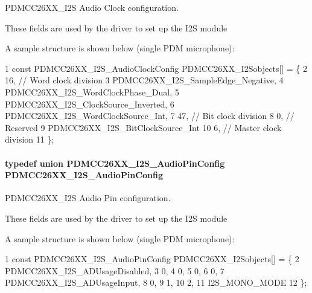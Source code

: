 P\+D\+M\+C\+C26\+X\+X\+\_\+\+I2\+S Audio Clock configuration. 

These fields are used by the driver to set up the I2\+S module

A sample structure is shown below (single P\+D\+M microphone)\+: 
\begin{DoxyCode}
1 const PDMCC26XX\_I2S\_AudioClockConfig PDMCC26XX\_I2Sobjects[] = \{
2         16, // Word clock division
3         PDMCC26XX\_I2S\_SampleEdge\_Negative,
4         PDMCC26XX\_I2S\_WordClockPhase\_Dual,
5         PDMCC26XX\_I2S\_ClockSource\_Inverted,
6         PDMCC26XX\_I2S\_WordClockSource\_Int,
7         47, // Bit clock division
8         0, // Reserved
9         PDMCC26XX\_I2S\_BitClockSource\_Int
10         6, // Master clock division
11 \};
\end{DoxyCode}
\paragraph[{P\+D\+M\+C\+C26\+X\+X\+\_\+\+I2\+S\+\_\+\+Audio\+Pin\+Config}]{\setlength{\rightskip}{0pt plus 5cm}typedef union {\bf P\+D\+M\+C\+C26\+X\+X\+\_\+\+I2\+S\+\_\+\+Audio\+Pin\+Config}  {\bf P\+D\+M\+C\+C26\+X\+X\+\_\+\+I2\+S\+\_\+\+Audio\+Pin\+Config}}\label{_p_d_m_c_c26_x_x__util_8h_ae4dd5264f128d13849211fc9baf12bea}


P\+D\+M\+C\+C26\+X\+X\+\_\+\+I2\+S Audio Pin configuration. 

These fields are used by the driver to set up the I2\+S module

A sample structure is shown below (single P\+D\+M microphone)\+: 
\begin{DoxyCode}
1 const PDMCC26XX\_I2S\_AudioPinConfig PDMCC26XX\_I2Sobjects[] = \{
2         PDMCC26XX\_I2S\_ADUsageDisabled,
3         0,
4         0,
5         0,
6         0,
7         PDMCC26XX\_I2S\_ADUsageInput,
8         0,
9         1,
10         2,
11         I2S\_MONO\_MODE
12 \};
\end{DoxyCode}
